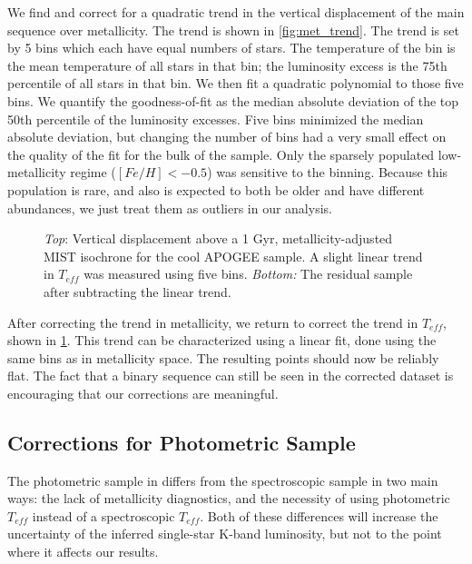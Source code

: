 \documentclass[manuscript]{aastex6}
\newcommand{\Teff}{\ensuremath{T_{eff}}}
\begin{document}
We find and correct for a quadratic trend in the vertical displacement of the
main sequence over metallicity. The trend is shown in \cref{fig:met_trend}.
The trend is set by 5 bins which each have equal numbers of stars. The
temperature of the bin is the mean temperature of all stars in that bin; the
luminosity excess is the 75th percentile of all stars in that bin. We then fit
a quadratic polynomial to those five bins. We quantify the goodness-of-fit as
the median absolute deviation of the top 50th percentile of the luminosity
excesses. Five bins minimized the median absolute deviation, but changing the
number of bins had a very small effect on the quality of the fit for the bulk
of the sample. Only the sparsely populated low-metallicity regime (\([Fe/H] <
-0.5\)) was sensitive to the binning. Because this population is rare, and also
is expected to both be older and have different abundances, we just treat them
as outliers in our analysis.

\begin{figure}[htb]
    \centering
    \caption{\emph{Top}: Vertical displacement above a 1 Gyr,
        metallicity-adjusted MIST isochrone for the cool APOGEE sample. A 
        slight linear trend in \Teff{} was measured using five bins. 
        \emph{Bottom:} The residual sample after subtracting the linear 
    trend.}
    \label{fig:apogee_teff_trend}
\end{figure}

After correcting the trend in metallicity, we return to correct the trend in
\Teff{}, shown in \cref{fig:apogee_teff_trend}. This trend can be characterized
using a linear fit, done using the same bins as in metallicity space. The 
resulting points should now be reliably flat. The fact that a binary sequence 
can still be seen in the corrected dataset is encouraging that our 
corrections are meaningful.

\subsection{Corrections for Photometric Sample}

The photometric sample in \citep{McQuillan14} differs from the spectroscopic
sample in two main ways: the lack of metallicity diagnostics, and the necessity
of using photometric \Teff{} instead of a spectroscopic \Teff{}. Both of these
differences will increase the uncertainty of the inferred single-star K-band
luminosity, but not to the point where it affects our results.
\end{document}
